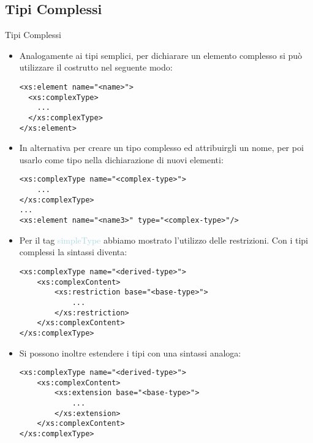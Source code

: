 \documentclass{beamer}
\begin{document}
      \subsection{Tipi Complessi}
   \begin{frame}[containsverbatim]{Tipi Complessi}
   \begin{itemize}
   \item Analogamente ai tipi semplici, per dichiarare un elemento complesso si può utilizzare il costrutto nel seguente modo:
         \begin{lstlisting}
<xs:element name="<name>">
  <xs:complexType>
  	...
  </xs:complexType>
</xs:element> 
	\end{lstlisting}
	   \item In alternativa per creare un tipo complesso ed attribuirgli un nome, per poi usarlo come tipo nella dichiarazione di nuovi elementi:
         \begin{lstlisting}
<xs:complexType name="<complex-type>">
	...
</xs:complexType>
...
<xs:element name="<name3>" type="<complex-type>"/>
	\end{lstlisting}
   \end{itemize}
   \end{frame}
      \begin{frame}[containsverbatim]
   \begin{itemize}
   \item Per il tag \textcolor{lightblue}{simpleType} abbiamo mostrato l'utilizzo delle restrizioni. Con i tipi complessi la sintassi diventa:
         \begin{lstlisting}
<xs:complexType name="<derived-type>">
	<xs:complexContent>
		<xs:restriction base="<base-type>">
			...
		</xs:restriction>
	</xs:complexContent>
</xs:complexType>
	\end{lstlisting}
	\item Si possono inoltre estendere i tipi con una sintassi analoga:
         \begin{lstlisting}
<xs:complexType name="<derived-type>">
	<xs:complexContent>
		<xs:extension base="<base-type>">
			...
		</xs:extension>
	</xs:complexContent>
</xs:complexType>
	\end{lstlisting}
   \end{itemize}
   \end{frame}
\end{document}
